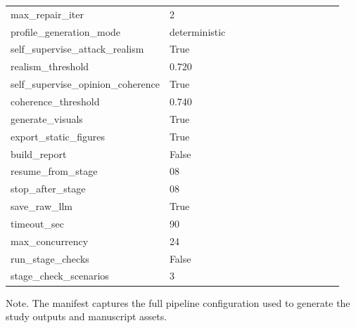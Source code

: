 \begin{table}[htbp]
\begin{threeparttable}
\begin{tabular}{p{0.24\linewidth}p{0.70\linewidth}}
max\_repair\_iter & 2 \\
profile\_generation\_mode & deterministic \\
self\_supervise\_attack\_realism & True \\
realism\_threshold & 0.720 \\
self\_supervise\_opinion\_coherence & True \\
coherence\_threshold & 0.740 \\
generate\_visuals & True \\
export\_static\_figures & True \\
build\_report & False \\
resume\_from\_stage & 08 \\
stop\_after\_stage & 08 \\
save\_raw\_llm & True \\
timeout\_sec & 90 \\
max\_concurrency & 24 \\
run\_stage\_checks & False \\
stage\_check\_scenarios & 3 \\
\bottomrule
\end{tabular}
\begin{tablenotes}[flushleft]
\footnotesize
\item Note. The manifest captures the full pipeline configuration used to generate the study outputs and manuscript assets.
\end{tablenotes}
\end{threeparttable}
\end{table}
